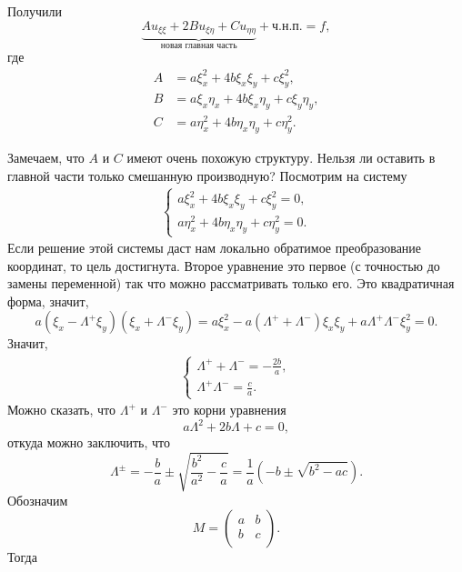 Получили
$$\underbrace {A u_{\xi \xi} + 2B u_{\xi \eta} + C u_{\eta \eta}}_{\text{новая главная часть}} + \text{ч.н.п.} = f,$$
где \begin{align*}
	A &= a \xi^2_x + 4b \xi_x \xi_y + c \xi^2_y, \\
	B &= a \xi_x \eta_x + 4b \xi_x \eta_y + c \xi_y \eta_y, \\
	C &= a \eta^2_x + 4b \eta_x \eta_y + c \eta^2_y.
\end{align*}

Замечаем, что $A$ и $C$ имеют очень похожую структуру. Нельзя ли оставить в главной части только смешанную производную? Посмотрим на систему
\begin{align*}
	\begin{cases*}
	a \xi^2_x + 4b \xi_x \xi_y + c \xi^2_y = 0, \\
	a \eta^2_x + 4b \eta_x \eta_y + c \eta^2_y = 0.
	\end{cases*}
\end{align*}
Если решение этой системы даст нам локально обратимое преобразование координат, то цель достигнута. Второе уравнение это первое (с точностью до замены переменной) так что можно рассматривать только его. Это квадратичная форма, значит,
$$ a (\xi_x - \Lambda^+ \xi_y)(\xi_x + \Lambda^- \xi_y) = a \xi^2_x - a(\Lambda^+ + \Lambda^-)\xi_x \xi_y + a \Lambda^+ \Lambda^- \xi_y^2 =  0.$$
Значит,
\begin{align*}
	\begin{cases*}
		\Lambda^+ + \Lambda^- = - \frac {2b} {a}, \\
		\Lambda^+ \Lambda^- = \frac {c} {a}.
	\end{cases*}
\end{align*}
Можно сказать, что $\Lambda^+$ и $\Lambda^-$ это корни уравнения
$$a \Lambda^2 + 2b \Lambda + c = 0,$$
откуда можно заключить, что
$$ \Lambda^{\pm} = - \frac {b} {a} \pm \sqrt{\frac {b^2} {a^2} - \frac {c} {a}} = \frac {1} {a} (-b \pm \sqrt{b^2 - ac}).$$
Обозначим $$M = \begin{pmatrix} a & b \\ b & c \\\end{pmatrix}.$$
Тогда 
